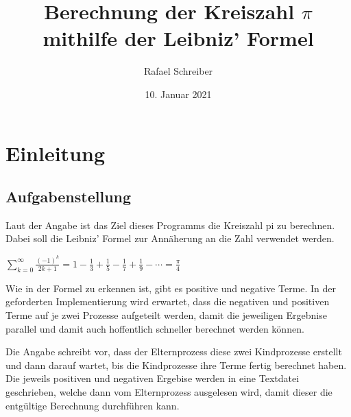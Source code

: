 \documentclass{article}
\begin{document}
\clearpage
\thispagestyle{empty}
\author{Rafael Schreiber}
\date{10. Januar 2021}
\title{Berechnung der Kreiszahl $\pi$ mithilfe der Leibniz' Formel}
\maketitle
\clearpage
{}
\tableofcontents
\newpage

\section{Einleitung}
\subsection{Aufgabenstellung}
Laut der Angabe ist das Ziel dieses Programms die Kreiszahl pi zu berechnen. Dabei soll die Leibniz' Formel zur Annäherung an die Zahl verwendet werden.


$\sum _{k=0}^{\infty }{\frac {(-1)^{k}}{2k+1}}=1-{\frac {1}{3}}+{\frac {1}{5}}-{\frac {1}{7}}+{\frac {1}{9}}-\dotsb ={\frac {\pi }{4}}$


Wie in der Formel zu erkennen ist, gibt es positive und negative Terme. In der geforderten Implementierung wird erwartet, dass die negativen und positiven Terme auf je zwei Prozesse aufgeteilt werden, damit die jeweiligen Ergebnise parallel und damit auch hoffentlich  schneller berechnet werden können.

Die Angabe schreibt vor, dass der Elternprozess diese zwei Kindprozesse erstellt und dann darauf wartet, bis die Kindprozesse ihre Terme fertig berechnet haben. Die jeweils positiven und negativen Ergebise werden in eine Textdatei geschrieben, welche dann vom Elternprozess ausgelesen wird, damit dieser die entgültige Berechnung durchführen kann.
\end{document}

